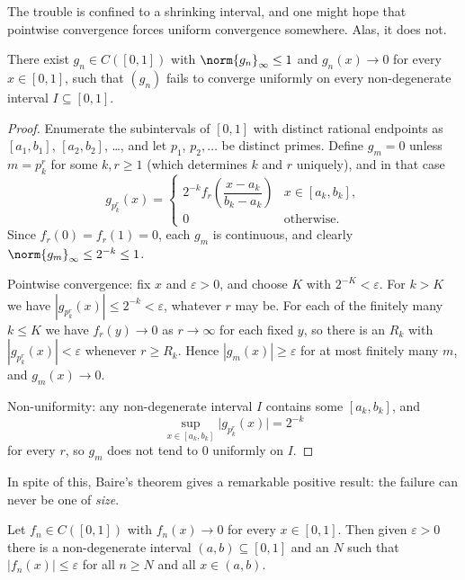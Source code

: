 \documentclass[a4paper]{scrartcl}
\begin{document}
The trouble is confined to a shrinking interval, and one might hope that pointwise convergence forces uniform convergence somewhere. Alas, it does not.

\begin{lemma}\label{lem:no-uniform-anywhere}
	There exist $g_n\in C([0,1])$ with $\norm{g_n}_\infty\leq1$ and $g_n(x)\to0$ for every $x\in[0,1]$, such that $(g_n)$ fails to converge uniformly on every non-degenerate interval $I\subseteq[0,1]$.
\end{lemma}

\begin{proof}
	Enumerate the subintervals of $[0,1]$ with distinct rational endpoints as $[a_1,b_1]$, $[a_2,b_2]$, \ldots, and let $p_1$, $p_2,\ldots$ be distinct primes. Define $g_m = 0$ unless $m = p_k^r$ for some $k,r\geq1$ (which determines $k$ and $r$ uniquely), and in that case
	$$g_{p_k^r}(x) = \begin{cases}2^{-k}f_r\!\left(\dfrac{x-a_k}{b_k-a_k}\right) & x\in[a_k,b_k],\\[4pt] 0 & \text{otherwise.}\end{cases}$$
	Since $f_r(0)=f_r(1)=0$, each $g_m$ is continuous, and clearly $\norm{g_m}_\infty\leq 2^{-k}\leq1$.

	Pointwise convergence: fix $x$ and $\varepsilon>0$, and choose $K$ with $2^{-K}<\varepsilon$. For $k > K$ we have $|g_{p_k^r}(x)|\leq2^{-k}<\varepsilon$, whatever $r$ may be. For each of the finitely many $k\leq K$ we have $f_r(y)\to0$ as $r\to\infty$ for each fixed $y$, so there is an $R_k$ with $|g_{p_k^r}(x)|<\varepsilon$ whenever $r\geq R_k$. Hence $|g_m(x)|\geq\varepsilon$ for at most finitely many $m$, and $g_m(x)\to0$.

	Non-uniformity: any non-degenerate interval $I$ contains some $[a_k,b_k]$, and
	$$\sup_{x\in[a_k,b_k]}\big|g_{p_k^r}(x)\big| = 2^{-k}$$
	for every $r$, so $g_m$ does not tend to $0$ uniformly on $I$.
\end{proof}

In spite of this, Baire's theorem gives a remarkable positive result: the failure can never be one of \emph{size}.

\begin{theorem}[Osgood]\label{thm:osgood}
	Let $f_n\in C([0,1])$ with $f_n(x)\to0$ for every $x\in[0,1]$. Then given $\varepsilon>0$ there is a non-degenerate interval $(a,b)\subseteq[0,1]$ and an $N$ such that $|f_n(x)|\leq\varepsilon$ for all $n\geq N$ and all $x\in(a,b)$.
\end{theorem}
\end{document}
